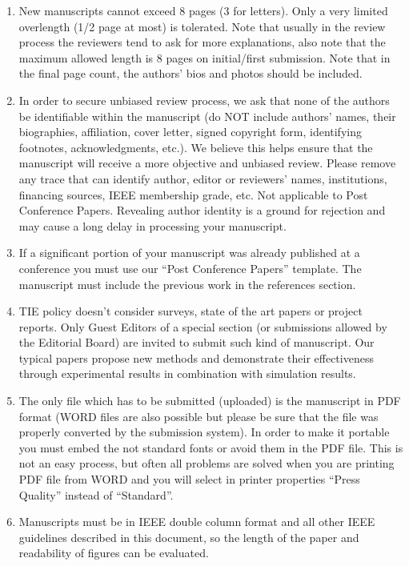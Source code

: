 \documentclass[journal]{IEEEtranTIE}
\begin{document}
\begin{enumerate}[1)]
	\item New manuscripts cannot exceed 8 pages (3 for letters). Only a very limited overlength (1/2 page at most) is tolerated. Note that usually in the review process the reviewers tend to ask for more explanations, also note that the maximum allowed length is 8 pages on initial/first submission.  Note that in the final page count, the authors' bios and photos should be included.
	\item In order to secure unbiased review process, we ask that none of the authors be identifiable within the manuscript (do NOT include authors' names, their biographies, affiliation, cover letter, signed copyright form, identifying footnotes, acknowledgments, etc.). We believe this helps ensure that the manuscript will receive a more objective and unbiased review. Please remove any trace that can identify author, editor or reviewers' names, institutions, financing sources, IEEE membership grade, etc. Not applicable to Post Conference Papers. Revealing author identity is a ground for rejection and may cause a long delay in processing your manuscript.
	\item If a significant portion of your manuscript was already published at a conference you must use our ``Post Conference Papers'' template. The manuscript must include the previous work in the references section. 
	\item TIE policy doesn't consider surveys, state of the art papers or project reports. Only Guest Editors of a special section (or submissions allowed by the Editorial Board) are invited to submit such kind of manuscript. Our typical papers propose new methods and demonstrate their effectiveness through experimental results in combination with simulation results.
	\item The only file which has to be submitted (uploaded) is the manuscript in PDF format (WORD files are also possible but please be sure that the file was properly converted by the submission system). In order to make it portable you must embed the not standard fonts or avoid them in the PDF file. This is not an easy process, but often all problems are solved when you are printing PDF file from WORD and you will select in printer properties  ``Press Quality'' instead of ``Standard''.
	\item Manuscripts must be in IEEE double column format and all other IEEE guidelines described in this document, so the length of the paper and readability of figures can be evaluated.

\end{enumerate}
\end{document}
